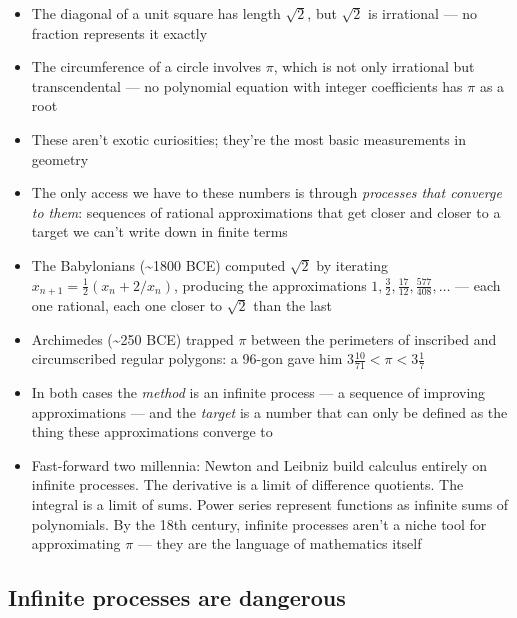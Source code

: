 \documentclass[
  10pt,
  letterpaper,
]{scrbook}
\providecommand{\tightlist}{%
  \setlength{\itemsep}{0pt}\setlength{\parskip}{0pt}}
\begin{document}
\begin{itemize}
\tightlist
\item
  The diagonal of a unit square has length \(\sqrt{2}\), but
  \(\sqrt{2}\) is irrational --- no fraction represents it exactly
\item
  The circumference of a circle involves \(\pi\), which is not only
  irrational but transcendental --- no polynomial equation with integer
  coefficients has \(\pi\) as a root
\item
  These aren't exotic curiosities; they're the most basic measurements
  in geometry
\item
  The only access we have to these numbers is through \emph{processes
  that converge to them}: sequences of rational approximations that get
  closer and closer to a target we can't write down in finite terms
\item
  The Babylonians (\textasciitilde1800 BCE) computed \(\sqrt{2}\) by
  iterating \(x_{n+1} = \frac{1}{2}(x_n + 2/x_n)\), producing the
  approximations
  \(1, \frac{3}{2}, \frac{17}{12}, \frac{577}{408}, \ldots\) --- each
  one rational, each one closer to \(\sqrt{2}\) than the last
\item
  Archimedes (\textasciitilde250 BCE) trapped \(\pi\) between the
  perimeters of inscribed and circumscribed regular polygons: a 96-gon
  gave him \(3\frac{10}{71} < \pi < 3\frac{1}{7}\)
\item
  In both cases the \emph{method} is an infinite process --- a sequence
  of improving approximations --- and the \emph{target} is a number that
  can only be defined as the thing these approximations converge to
\item
  Fast-forward two millennia: Newton and Leibniz build calculus entirely
  on infinite processes. The derivative is a limit of difference
  quotients. The integral is a limit of sums. Power series represent
  functions as infinite sums of polynomials. By the 18th century,
  infinite processes aren't a niche tool for approximating \(\pi\) ---
  they are the language of mathematics itself
\end{itemize}

\subsection*{Infinite processes are
dangerous}\label{infinite-processes-are-dangerous}
\end{document}
